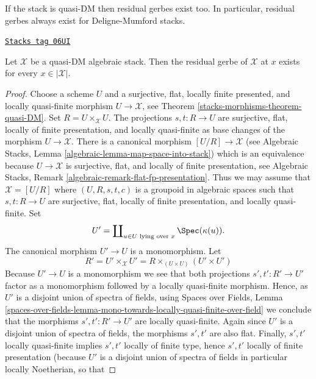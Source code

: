 If the stack is quasi-DM then residual gerbes exist too.
In particular, residual gerbes always exist for Deligne-Mumford stacks.

\begin{lemma}
\label{stacks-morphisms-lemma-every-point-residual-gerbe-quasi-DM}
\href{https://stacks.math.columbia.edu/tag/06UI}{\texttt{Stacks tag 06UI}}

Let $\mathcal{X}$ be a quasi-DM algebraic stack.
Then the residual gerbe of $\mathcal{X}$ at $x$ exists for
every $x \in |\mathcal{X}|$.
\end{lemma}

\begin{proof}
Choose a scheme $U$ and a surjective, flat, locally finite presented,
and locally quasi-finite morphism $U \to \mathcal{X}$, see
Theorem \ref{stacks-morphisms-theorem-quasi-DM}.
Set $R = U \times_\mathcal{X} U$. The projections $s, t : R \to U$
are surjective, flat, locally of finite presentation, and
locally quasi-finite as base changes of the morphism $U \to \mathcal{X}$.
There is a canonical morphism $[U/R] \to \mathcal{X}$ (see
Algebraic Stacks, Lemma \ref{algebraic-lemma-map-space-into-stack})
which is an equivalence because $U \to \mathcal{X}$ is surjective, flat,
and locally of finite presentation, see
Algebraic Stacks, Remark \ref{algebraic-remark-flat-fp-presentation}.
Thus we may assume that $\mathcal{X} = [U/R]$ where
$(U, R, s, t, c)$ is a groupoid in algebraic spaces such that
$s, t : R \to U$ are surjective, flat, locally of finite presentation,
and locally quasi-finite. Set
$$
U' = \coprod\nolimits_{u \in U\text{ lying over }x} \Spec(\kappa(u)).
$$
The canonical morphism $U' \to U$ is a monomorphism. Let
$$
R' = U' \times_\mathcal{X} U' =
R \times_{(U \times U)} (U' \times U')
$$
Because $U' \to U$ is a monomorphism we see that both projections
$s', t' : R' \to U'$ factor as a monomorphism followed by a locally
quasi-finite morphism. Hence, as $U'$ is a disjoint union of spectra
of fields, using
Spaces over Fields, Lemma
\ref{spaces-over-fields-lemma-mono-towards-locally-quasi-finite-over-field}
we conclude that the morphisms $s', t' : R' \to U'$ are locally quasi-finite.
Again since $U'$ is a disjoint union of spectra of fields, the morphisms
$s', t'$ are also flat. Finally, $s', t'$ locally quasi-finite
implies $s', t'$ locally of finite type, hence $s', t'$ locally of finite
presentation (because $U'$ is a disjoint union of spectra of fields
in particular locally Noetherian, so that

\end{proof}

